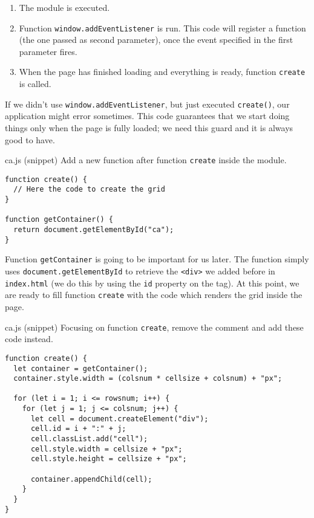 \begin{enumerate}
\item The module is executed.
\item Function \texttt{window.addEventListener} is run. This code will register a function (the one
passed as second parameter), once the event specified in the first parameter fires.
\item When the page has finished loading and everything is ready, function \texttt{create} is called.
\end{enumerate}

If we didn't use \texttt{window.addEventListener}, but just executed \texttt{create()}, our
application might error sometimes. This code guarantees that we start doing things only when
the page is fully loaded; we need this guard and it is always good to have.

\begin{programcode}{ca.js (snippet)}
Add a new function after function \texttt{create} inside the module.
\begin{verbatim}
function create() {
  // Here the code to create the grid
}

function getContainer() {
  return document.getElementById("ca");
}
\end{verbatim}
\end{programcode}

Function \texttt{getContainer} is going to be important for us later. The function simply
uses \texttt{document.getElementById} to retrieve the \texttt{<div>} we added before in
\texttt{index.html} (we do this by using the \texttt{id} property on the tag).
At this point, we are ready to fill function
\texttt{create} with the code which renders the grid inside the page.

\begin{programcode}{ca.js (snippet)}
Focusing on function \texttt{create}, remove the comment and add these code instead.
\begin{verbatim}
function create() {
  let container = getContainer();
  container.style.width = (colsnum * cellsize + colsnum) + "px";

  for (let i = 1; i <= rowsnum; i++) {
    for (let j = 1; j <= colsnum; j++) {
      let cell = document.createElement("div");
      cell.id = i + ":" + j;
      cell.classList.add("cell");
      cell.style.width = cellsize + "px";
      cell.style.height = cellsize + "px";

      container.appendChild(cell);
    }
  }
}
\end{verbatim}
\end{programcode}

